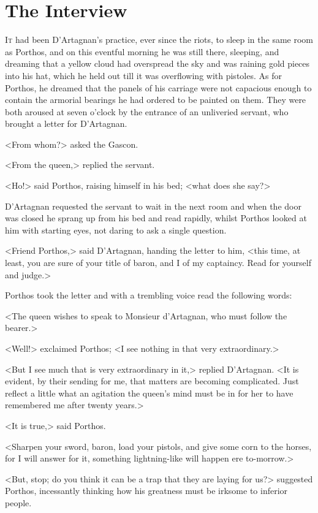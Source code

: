 \chapter{The Interview}

 \lettrine{I}{t} had been D'Artagnan's practice, ever since the riots, to sleep in the same room as Porthos, and on this eventful morning he was still there, sleeping, and dreaming that a yellow cloud had overspread the sky and was raining gold pieces into his hat, which he held out till it was overflowing with pistoles. As for Porthos, he dreamed that the panels of his carriage were not capacious enough to contain the armorial bearings he had ordered to be painted on them. They were both aroused at seven o'clock by the entrance of an unliveried servant, who brought a letter for D'Artagnan.

<From whom?> asked the Gascon.

<From the queen,> replied the servant.

<Ho!> said Porthos, raising himself in his bed; <what does she say?>

D'Artagnan requested the servant to wait in the next room and when the door was closed he sprang up from his bed and read rapidly, whilst Porthos looked at him with starting eyes, not daring to ask a single question.

<Friend Porthos,> said D'Artagnan, handing the letter to him, <this time, at least, you are sure of your title of baron, and I of my captaincy. Read for yourself and judge.>

Porthos took the letter and with a trembling voice read the following words:

<The queen wishes to speak to Monsieur d'Artagnan, who must follow the bearer.>

<Well!> exclaimed Porthos; <I see nothing in that very extraordinary.>

<But I see much that is very extraordinary in it,> replied D'Artagnan. <It is evident, by their sending for me, that matters are becoming complicated. Just reflect a little what an agitation the queen's mind must be in for her to have remembered me after twenty years.>

<It is true,> said Porthos.

<Sharpen your sword, baron, load your pistols, and give some corn to the horses, for I will answer for it, something lightning-like will happen ere to-morrow.>

<But, stop; do you think it can be a trap that they are laying for us?> suggested Porthos, incessantly thinking how his greatness must be irksome to inferior people.

